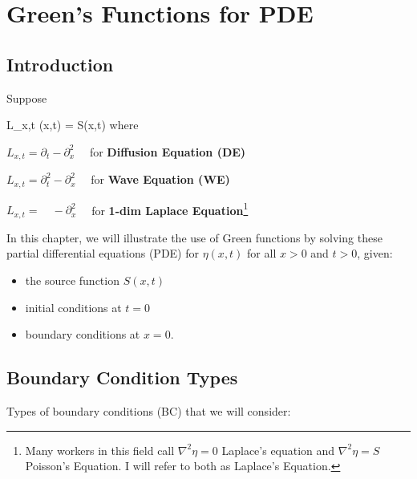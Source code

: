\chapter{Green's Functions for PDE}
\label{ch-green-fun-pde}


\section{Introduction}
Suppose

\beq
L_{x,t} \eta(x,t) = S(x,t)
\eeq
where

$L_{x, t}=\partial_t -\partial_x^2\quad$ for {\bf Diffusion Equation (DE)}


$L_{x, t}=\partial_t^2 -\partial_x^2\quad$ for {\bf Wave Equation (WE)}

$L_{x, t}=\quad -\partial_x^2\quad$   for {\bf 1-dim Laplace Equation}\footnote{Many workers in this field call $\nabla^2 \eta=0$ Laplace's equation and $\nabla^2 \eta=S$ Poisson's Equation. I will
refer to both as Laplace's Equation.}





In this chapter, we will illustrate the use of Green
functions by solving these partial
differential equations (PDE)
for $\eta(x,t)$ for all $x>0$ and $t>0$, given:
\begin{itemize} 
\item the source function $S(x,t)$
\item  initial
conditions at $t=0$
\item boundary conditions 
at $x=0$.
\end{itemize}

\section{Boundary Condition Types}
Types of boundary conditions (BC) that we will consider:

